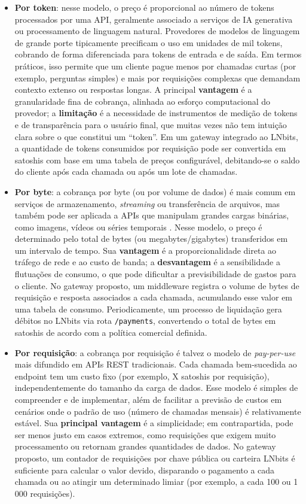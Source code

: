 \documentclass[openright]{normas-utf-tex}
\begin{document}
\begin{itemize}
    \item \textbf{Por token}: nesse modelo, o preço é proporcional ao número de tokens processados por uma API, geralmente associado a serviços de IA generativa ou processamento de linguagem natural. Provedores de modelos de linguagem de grande porte tipicamente precificam o uso em unidades de mil tokens, cobrando de forma diferenciada para tokens de entrada e de saída. Em termos práticos, isso permite que um cliente pague menos por chamadas curtas (por exemplo, perguntas simples) e mais por requisições complexas que demandam contexto extenso ou respostas longas. A principal \textbf{vantagem} é a granularidade fina de cobrança, alinhada ao esforço computacional do provedor; a \textbf{limitação} é a necessidade de instrumentos de medição de tokens e de transparência para o usuário final, que muitas vezes não tem intuição clara sobre o que constitui um ``token''. Em um gateway integrado ao LNbits, a quantidade de tokens consumidos por requisição pode ser convertida em satoshis com base em uma tabela de preços configurável, debitando-se o saldo do cliente após cada chamada ou após um lote de chamadas.
    
    \item \textbf{Por byte}: a cobrança por byte (ou por volume de dados) é mais comum em serviços de armazenamento, \textit{streaming} ou transferência de arquivos, mas também pode ser aplicada a APIs que manipulam grandes cargas binárias, como imagens, vídeos ou séries temporais \cite{trefke2020usagebased}. Nesse modelo, o preço é determinado pelo total de bytes (ou megabytes/gigabytes) transferidos em um intervalo de tempo. Sua \textbf{vantagem} é a proporcionalidade direta ao tráfego de rede e ao custo de banda; a \textbf{desvantagem} é a sensibilidade a flutuações de consumo, o que pode dificultar a previsibilidade de gastos para o cliente. No gateway proposto, um middleware registra o volume de bytes de requisição e resposta associados a cada chamada, acumulando esse valor em uma tabela de consumo. Periodicamente, um processo de liquidação gera débitos no LNbits via rota \texttt{/payments}, convertendo o total de bytes em satoshis de acordo com a política comercial definida.
    
    \item \textbf{Por requisição}: a cobrança por requisição é talvez o modelo de \textit{pay-per-use} mais difundido em APIs REST tradicionais. Cada chamada bem-sucedida ao endpoint tem um custo fixo (por exemplo, X satoshis por requisição), independentemente do tamanho da carga de dados. Esse modelo é simples de compreender e de implementar, além de facilitar a previsão de custos em cenários onde o padrão de uso (número de chamadas mensais) é relativamente estável. Sua \textbf{principal vantagem} é a simplicidade; em contrapartida, pode ser menos justo em casos extremos, como requisições que exigem muito processamento ou retornam grandes quantidades de dados. No gateway proposto, um contador de requisições por chave pública ou carteira LNbits é suficiente para calcular o valor devido, disparando o pagamento a cada chamada ou ao atingir um determinado limiar (por exemplo, a cada 100 ou 1\,000 requisições).
\end{itemize}
\end{document}

